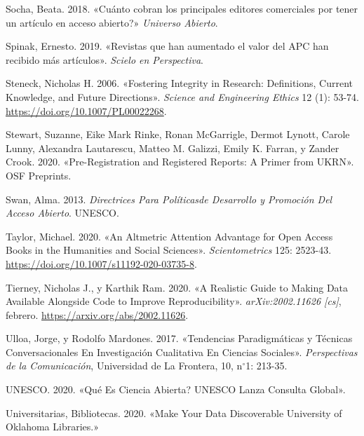 \documentclass[
  spanish,
  letterpaper,
  DIV=11,
  numbers=noendperiod]{scrreprt}
\newlength{\cslhangindent}
\newenvironment{CSLReferences}[2] %
 {\begin{list}{}{%
  \setlength{\itemindent}{0pt}
  \setlength{\leftmargin}{0pt}
  \setlength{\parsep}{0pt}
  \ifodd #1
   \setlength{\leftmargin}{\cslhangindent}
   \setlength{\itemindent}{-1\cslhangindent}
  \fi
  \setlength{\itemsep}{#2\baselineskip}}}
 {\end{list}}
\begin{document}
\begin{CSLReferences}{1}{0}
Socha, Beata. 2018. {«{{\textquestiondown}Cu{á}nto cobran los
principales editores comerciales por tener un art{í}culo en acceso
abierto?}»} \emph{Universo Abierto}.

Spinak, Ernesto. 2019. {«{Revistas que han aumentado el valor del APC
han recibido m{á}s art{í}culos}»}. \emph{Scielo en Perspectiva}.

Steneck, Nicholas H. 2006. {«Fostering Integrity in Research:
{Definitions}, Current Knowledge, and Future Directions»}. \emph{Science
and Engineering Ethics} 12 (1): 53-74.
\url{https://doi.org/10.1007/PL00022268}.

Stewart, Suzanne, Eike Mark Rinke, Ronan McGarrigle, Dermot Lynott,
Carole Lunny, Alexandra Lautarescu, Matteo M. Galizzi, Emily K. Farran,
y Zander Crook. 2020. {«Pre-Registration and {Registered Reports}: A
{Primer} from {UKRN}»}. OSF Preprints.

Swan, Alma. 2013. \emph{Directrices Para Pol{í}ticasde Desarrollo y
Promoci{ó}n Del Acceso Abierto}. UNESCO.

Taylor, Michael. 2020. {«An Altmetric Attention Advantage for Open
Access Books in the Humanities and Social Sciences»}.
\emph{Scientometrics} 125: 2523-43.
\url{https://doi.org/10.1007/s11192-020-03735-8}.

Tierney, Nicholas J., y Karthik Ram. 2020. {«A {Realistic Guide} to
{Making Data Available Alongside Code} to {Improve Reproducibility}»}.
\emph{arXiv:2002.11626 {[}cs{]}}, febrero.
\url{https://arxiv.org/abs/2002.11626}.

Ulloa, Jorge, y Rodolfo Mardones. 2017. {«Tendencias Paradigm{á}ticas y
T{é}cnicas Conversacionales En Investigaci{ó}n {Cualitativa} En
{Ciencias Sociales}»}. \emph{Perspectivas de la Comunicaci{ó}n},
Universidad de La {Frontera}, 10, n{\(^\circ\)}1: 213-35.

UNESCO. 2020. {«Qu{é} {Es Ciencia Abierta}? {UNESCO Lanza Consulta
Global}»}.

Universitarias, Bibliotecas. 2020. {«Make {Your Data Discoverable}
{\textbar} {University} of {Oklahoma Libraries}.»}


\end{CSLReferences}
\end{document}
